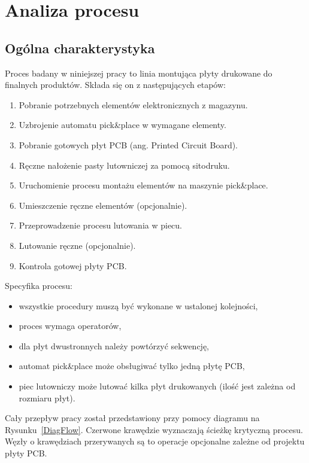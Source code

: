 \chapter{Analiza procesu}

\section{Ogólna charakterystyka}
Proces badany w  niniejszej pracy to linia montująca płyty drukowane do finalnych produktów.
Składa się on z następujących etapów:
\begin{enumerate}
	\item Pobranie potrzebnych elementów elektronicznych z magazynu.
	\item Uzbrojenie automatu pick\&place w wymagane elementy.
	\item Pobranie gotowych płyt PCB (ang. Printed Circuit Board).
	\item Ręczne nałożenie pasty lutowniczej za pomocą sitodruku.
	\item Uruchomienie procesu montażu elementów na maszynie pick\&place.
	\item Umieszczenie ręczne elementów (opcjonalnie).
	\item Przeprowadzenie procesu lutowania w piecu.
	\item Lutowanie ręczne (opcjonalnie).
	\item Kontrola gotowej płyty PCB\@.
\end{enumerate}

\breakparagraph{}
Specyfika procesu:
\begin{itemize}
	\item wszystkie procedury muszą być wykonane w ustalonej kolejności,
	\item proces wymaga operatorów,
	\item dla płyt dwustronnych należy powtórzyć sekwencję,
	\item automat pick\&place może obsługiwać tylko jedną płytę PCB,
	\item piec lutowniczy może lutować kilka płyt drukowanych (ilość jest zależna od rozmiaru płyt).
\end{itemize}

Cały przepływ pracy został przedstawiony przy pomocy diagramu na Rysunku~\ref{DiagFlow}.
Czerwone krawędzie wyznaczają ścieżkę krytyczną procesu.
Węzły o krawędziach przerywanych są to operacje opcjonalne zależne od projektu płyty PCB\@.

